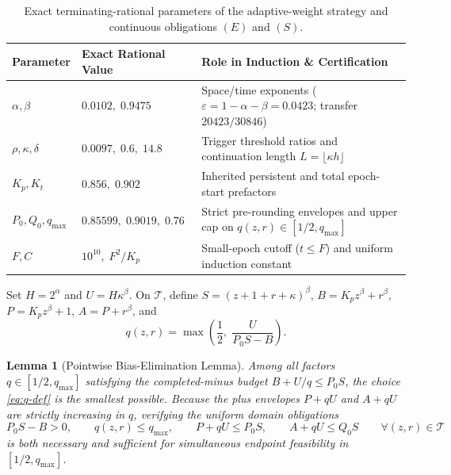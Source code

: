 \documentclass[11pt,letterpaper]{article}
\newtheorem{lemma}[theorem]{Lemma}
\theoremstyle{definition}
\theoremstyle{remark}
\begin{document}
\begin{table}[!htbp]
\centering
\caption{Exact terminating-rational parameters of the adaptive-weight strategy and continuous obligations $(E)$ and $(S)$.}
\label{tab:cal-params}
\small
\begin{tabularx}{\linewidth}{@{}l l X@{}}
\toprule
\textbf{Parameter} & \textbf{Exact Rational Value} & \textbf{Role in Induction \& Certification} \\
\midrule
$\alpha, \beta$ & $0.0102,\; 0.9475$ & Space/time exponents ($\varepsilon = 1-\alpha-\beta = 0.0423$; transfer $20423/30846$) \\
$\rho, \kappa, \delta$ & $0.0097,\; 0.6,\; 14.8$ & Trigger threshold ratios and continuation length $L = \lfloor \kappa h\rfloor$ \\
$K_p, K_t$ & $0.856,\; 0.902$ & Inherited persistent and total epoch-start prefactors \\
$P_0, Q_0, q_{\max}$ & $0.85599,\; 0.9019,\; 0.76$ & Strict pre-rounding envelopes and upper cap on $q(z,r) \in [1/2, q_{\max}]$ \\
$F, C$ & $10^{10},\; F^2/K_p$ & Small-epoch cutoff ($t \le F$) and uniform induction constant \\
\bottomrule
\end{tabularx}
\end{table}

Set $H = 2^\alpha$ and $U = H \kappa^\beta$. On $\mathcal{T}$, define $S = (z+1+r+\kappa)^\beta$, $B = K_p z^\beta + r^\beta$, $P = K_p z^\beta + 1$, $A = P + r^\beta$, and
\begin{equation}\label{eq:q-def}
  q(z,r) = \max\!\left(\frac{1}{2},\; \frac{U}{P_0 S - B}\right).
\end{equation}

\begin{lemma}[Pointwise Bias-Elimination Lemma]\label{lem:bias}
Among all factors $q \in [1/2, q_{\max}]$ satisfying the completed-minus budget $B + U/q \le P_0 S$, the choice \eqref{eq:q-def} is the smallest possible. Because the plus envelopes $P + qU$ and $A + qU$ are strictly increasing in $q$, verifying the uniform domain obligations
\begin{equation}\label{eq:oblig-E}
  P_0 S - B > 0, \qquad q(z,r) \le q_{\max}, \qquad P + qU \le P_0 S, \qquad A + qU \le Q_0 S \qquad \forall (z,r) \in \mathcal{T}
\end{equation}
is both necessary and sufficient for simultaneous endpoint feasibility in $[1/2, q_{\max}]$.
\end{lemma}
\end{document}
